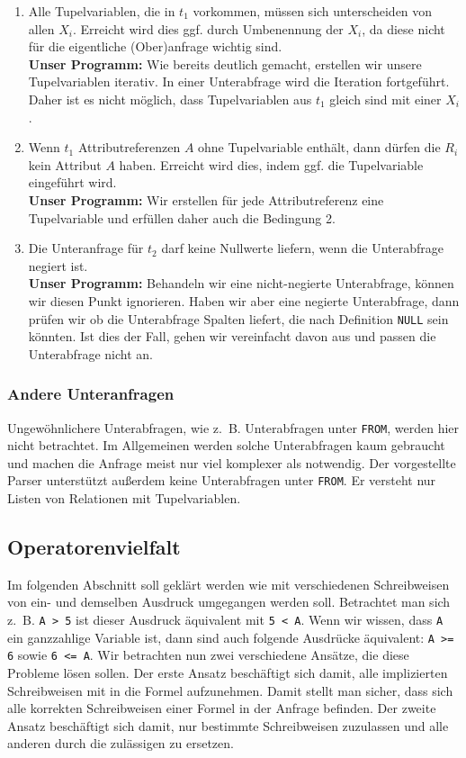 \begin{enumerate}
\item Alle Tupelvariablen, die in $t_1$ vorkommen, müssen sich unterscheiden von allen $X_i$. Erreicht wird dies ggf. durch Umbenennung der $X_i$, da diese nicht für die eigentliche (Ober)anfrage wichtig sind.\\
\textbf{Unser Programm:} Wie bereits deutlich gemacht, erstellen wir unsere Tupelvariablen iterativ. In einer Unterabfrage wird die Iteration fortgeführt. Daher ist es nicht möglich, dass Tupelvariablen aus $t_1$ gleich sind mit einer $X_i$.
\item Wenn $t_1$ Attributreferenzen $A$ ohne Tupelvariable enthält, dann dürfen die $R_i$ kein Attribut $A$ haben. Erreicht wird dies, indem ggf. die Tupelvariable eingeführt wird.\\
\textbf{Unser Programm:} Wir erstellen für jede Attributreferenz eine Tupelvariable und erfüllen daher auch die Bedingung 2.
\item Die Unteranfrage für $t_2$ darf keine Nullwerte liefern, wenn die Unterabfrage negiert ist. \\
\textbf{Unser Programm:} Behandeln wir eine nicht-negierte Unterabfrage, können wir diesen Punkt ignorieren. Haben wir aber eine negierte Unterabfrage, dann prüfen wir ob die Unterabfrage Spalten liefert, die nach Definition \verb|NULL| sein könnten. Ist dies der Fall, gehen wir vereinfacht davon aus und passen die Unterabfrage nicht an.
\end{enumerate}

\subsubsection{Andere Unteranfragen}

Ungewöhnlichere Unterabfragen, wie \mbox{z. B.} Unterabfragen unter \verb|FROM|, werden hier nicht betrachtet. Im Allgemeinen werden solche Unterabfragen kaum gebraucht und machen die Anfrage meist nur viel komplexer als notwendig. Der vorgestellte Parser unterstützt außerdem keine Unterabfragen unter \verb|FROM|. Er versteht nur Listen von Relationen mit Tupelvariablen.

\subsection{Operatorenvielfalt}

Im folgenden Abschnitt soll geklärt werden wie mit verschiedenen Schreibweisen von ein- und demselben Ausdruck umgegangen werden soll. Betrachtet man sich \mbox{z. B.} \verb|A > 5| ist dieser Ausdruck äquivalent mit \verb|5 < A|. Wenn wir wissen, dass \verb|A| ein ganzzahlige Variable ist, dann sind auch folgende Ausdrücke äquivalent: \verb|A >= 6| sowie \verb|6 <= A|. Wir betrachten nun zwei verschiedene Ansätze, die diese Probleme lösen sollen. Der erste Ansatz beschäftigt sich damit, alle implizierten Schreibweisen mit in die Formel aufzunehmen. Damit stellt man sicher, dass sich alle korrekten Schreibweisen einer Formel in der Anfrage befinden. Der zweite Ansatz beschäftigt sich damit, nur bestimmte Schreibweisen zuzulassen und alle anderen durch die zulässigen zu ersetzen.

